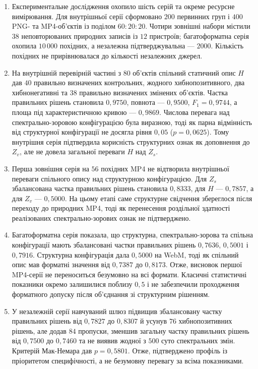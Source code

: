 \begin{enumerate}[label=\arabic*.]
\item Експериментальне дослідження охопило шість серій та окреме ресурсне вимірювання. Для внутрішньої серії сформовано $200$ первинних груп і $400$ PNG- та MP4-об’єктів із поділом $60:20:20$. Чотири зовнішні набори містили $38$ неповторюваних природних записів із $12$ пристроїв; багатоформатна серія охопила $10\,000$ похідних, а незалежна підтверджувальна --- $2000$. Кількість похідних не прирівнювалася до кількості незалежних джерел.

\item На внутрішній перевірній частині з $80$ об’єктів спільний статичний опис $H$ дав $40$ правильно визначених контрольних, жодного хибнопозитивного, два хибнонегативні та $38$ правильно визначених змінених об’єктів. Частка правильних рішень становила $0{,}9750$, повнота --- $0{,}9500$, $F_1=0{,}9744$, а площа під характеристичною кривою --- $0{,}9869$. Числова перевага над спектрально-зоровою конфігурацією була виразною, тоді як парна відмінність від структурної конфігурації не досягла рівня $0{,}05$ ($p=0{,}0625$). Тому внутрішня серія підтвердила корисність структурних ознак як доповнення до $Z_v$, але не довела загальної переваги $H$ над $Z_s$.

\item Перша зовнішня серія на $56$ похідних MP4 не відтворила внутрішньої переваги спільного опису над структурною конфігурацією. Для $Z_s$ збалансована частка правильних рішень становила $0{,}8333$, для $H$ --- $0{,}7857$, а для $Z_v$ --- $0{,}5000$. На цьому етапі саме структурне свідчення збереглося після переходу до природних MP4, тоді як перенесення роздільної здатності реалізованих спектрально-зорових ознак не підтверджено.

\item Багатоформатна серія показала, що структурна, спектрально-зорова та спільна конфігурації мають збалансовані частки правильних рішень $0{,}7636$, $0{,}5001$ і $0{,}7916$. Структурна конфігурація дала $0{,}5000$ на WebM, тоді як спільний опис мав форматні значення від $0{,}7387$ до $0{,}8173$. Отже, висновок першої MP4-серії не переноситься безумовно на всі формати. Класичні статистичні показники окремо залишилися поблизу $0{,}5$ і не забезпечили проходження форматного допуску після об’єднання зі структурним рішенням.

\item У незалежній серії навчуваний шлюз підвищив збалансовану частку правильних рішень від $0{,}7827$ до $0{,}8307$ й усунув $76$ хибнопозитивних рішень, але додав $84$ пропуски, зменшив загальну частку правильних рішень від $0{,}7500$ до $0{,}7460$ та не виявив жодної з $500$ суто спектральних змін. Критерій Мак-Немара дав $p=0{,}5801$. Отже, підтверджено профіль із пріоритетом специфічності, а не безумовну перевагу за всіма показниками.


\end{enumerate}
